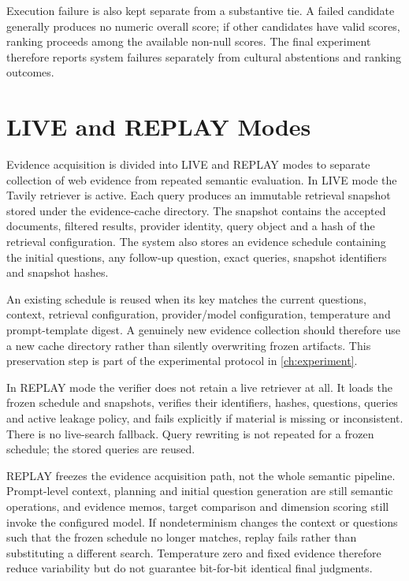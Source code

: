 Execution failure is also kept separate from a substantive tie. A failed candidate generally produces no numeric overall score; if other candidates have valid scores, ranking proceeds among the available non-null scores. The final experiment therefore reports system failures separately from cultural abstentions and ranking outcomes.

\section{LIVE and REPLAY Modes}
\label{sec:live-replay}

Evidence acquisition is divided into LIVE and REPLAY modes to separate collection of web evidence from repeated semantic evaluation. In LIVE mode the Tavily retriever is active. Each query produces an immutable retrieval snapshot stored under the evidence-cache directory. The snapshot contains the accepted documents, filtered results, provider identity, query object and a hash of the retrieval configuration. The system also stores an evidence schedule containing the initial questions, any follow-up question, exact queries, snapshot identifiers and snapshot hashes.

An existing schedule is reused when its key matches the current questions, context, retrieval configuration, provider/model configuration, temperature and prompt-template digest. A genuinely new evidence collection should therefore use a new cache directory rather than silently overwriting frozen artifacts. This preservation step is part of the experimental protocol in \cref{ch:experiment}.

In REPLAY mode the verifier does not retain a live retriever at all. It loads the frozen schedule and snapshots, verifies their identifiers, hashes, questions, queries and active leakage policy, and fails explicitly if material is missing or inconsistent. There is no live-search fallback. Query rewriting is not repeated for a frozen schedule; the stored queries are reused.

REPLAY freezes the evidence acquisition path, not the whole semantic pipeline. Prompt-level context, planning and initial question generation are still semantic operations, and evidence memos, target comparison and dimension scoring still invoke the configured model. If nondeterminism changes the context or questions such that the frozen schedule no longer matches, replay fails rather than substituting a different search. Temperature zero and fixed evidence therefore reduce variability but do not guarantee bit-for-bit identical final judgments.

